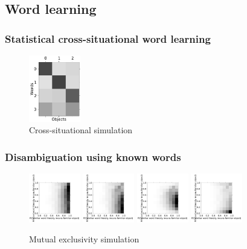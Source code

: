 \documentclass{article} %
\begin{document}
\subsection{Word learning}

\subsubsection{Statistical cross-situational word learning}

\begin{figure}
  \centering
  \includegraphics[width=0.20\textwidth]{figures/cross-sit.pdf}
  \caption{Cross-situational simulation}
  \label{fig:cross-sit}
\end{figure}

\subsubsection{Disambiguation using known words}


\begin{figure}
  \centering
  \includegraphics[width=0.20\textwidth]{figures/ME-1dax.pdf}
  \includegraphics[width=0.20\textwidth]{figures/ME-flat-10dog-10dax.pdf}
  \includegraphics[width=0.20\textwidth]{figures/ME-antisparse-10dog-10dax.pdf}
  \includegraphics[width=0.20\textwidth]{figures/ME-sparse-10dog-10dax.pdf}
  \caption{Mutual exclusivity simulation}
  \label{fig:mutual-exclusivity}
\end{figure}
\end{document}
